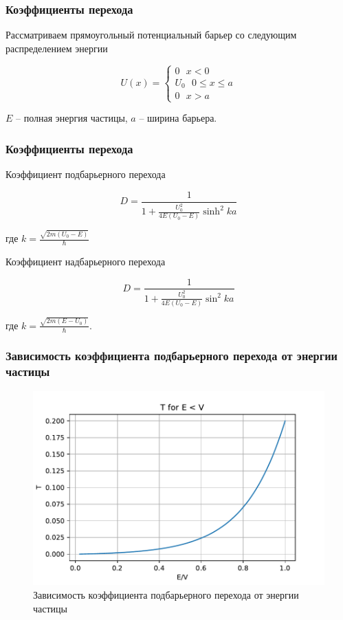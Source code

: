 \documentclass{beamer}
\begin{document}
\begin{frame}
\frametitle{Коэффициенты перехода}

Рассматриваем прямоугольный потенциальный барьер со следующим распределением энергии

\begin{equation*}
    U(x) = 
    \begin{cases}
        0 ~~~ x < 0 \\
        U_0 ~~~ 0 \leq x \leq a \\
        0 ~~~ x > a
    \end{cases}
\end{equation*}

$E$ -- полная энергия частицы, $a$ -- ширина барьера.

\end{frame}

\begin{frame}
\frametitle{Коэффициенты перехода}

Коэффициент подбарьерного перехода

\begin{equation*}
    D = \frac{1}{1 + \frac{U_0^2}{4 E (U_0 - E)}\sinh^2 {k a}}
\end{equation*}

где $\displaystyle k = \frac{\sqrt{2m (U_0 - E)}}{\hbar}$

Коэффициент надбарьерного перехода

\begin{equation*}
    D = \frac{1}{1 + \frac{U_0^2}{4 E (U_0 - E)}\sin^2 {k a}}
\end{equation*}

где $\displaystyle k = \frac{\sqrt{2m (E - U_0)}}{\hbar}$.
    
\end{frame}

\begin{frame}
\frametitle{Зависимость коэффициента подбарьерного перехода от энергии частицы}

\begin{figure}
    \centering
    \includegraphics[scale=0.5]{images/TransmissionPropability2.pdf}
    \caption{Зависимость коэффициента подбарьерного перехода от энергии частицы}
    \label{fig:TransmissionPropability2}
\end{figure}
    
\end{frame}
\end{document}
